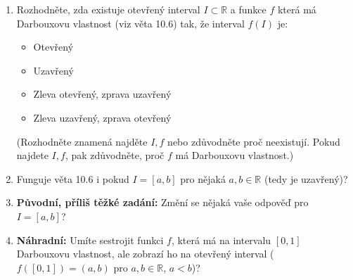 \begin{enumerate}

	\item  Rozhodněte, zda existuje otevřený interval $I \subset \mathbb{R}$ a funkce $f$ která má Darbouxovu vlastnost (viz věta 10.6) tak, že interval $f(I)$ je:

		\begin{itemize}

			\item  Otevřený

			\item  Uzavřený

			\item  Zleva otevřený, zprava uzavřený

			\item  Zleva uzavřený, zprava otevřený

		\end{itemize}

		(Rozhodněte znamená najděte $I, f$ nebo zdůvodněte proč neexistují. Pokud najdete $I, f$, pak zdůvodněte, proč $f$ má Darbouxovu vlastnost.)

	\item  Funguje věta 10.6 i pokud $I = [a, b]$ pro nějaká $a, b \in \mathbb{R}$ (tedy je uzavřený)?

	\item  \textbf{Původní, příliš těžké zadání:} Změní se nějaká vaše odpověď pro $I = [a, b]$?

	\item  \textbf{Náhradní:} Umíte sestrojit funkci $f$, která má na intervalu $[0, 1]$ Darbouxovu vlastnost, ale zobrazí ho na otevřený interval ($f([0, 1]) = (a, b)$ pro $a, b \in \mathbb{R}$, $a < b$)?

\end{enumerate}
